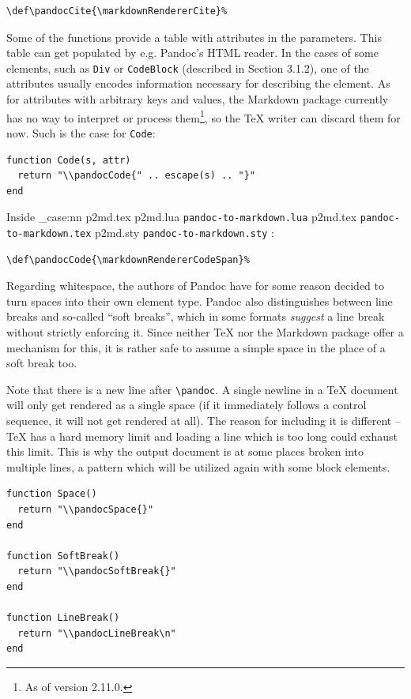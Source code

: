 \documentclass[
  digital,     %
  oneside,     %
  nosansbold,  %
  nocolorbold, %
  lof,         %
  nolot,       %
]{fithesis4}
\newcommand\macro[1]{\texttt{\textbackslash{}{#1}}}
\newcommand\pandoc[1]{\macro{pandoc\-{#1}}}
\newcommand\file[1]
  {
    \str_case:nn
      { #1 }
      {
        { p2md.lua } { \texttt{pandoc\hyp{}to\hyp{}markdown.lua} }
        { p2md.tex } { \texttt{pandoc\hyp{}to\hyp{}markdown.tex} }
        { p2md.sty } { \texttt{pandoc\hyp{}to\hyp{}markdown.sty} }
      }
  }
\begin{document}
\noindent
\lstset{language=[plain]TeX}
\begin{lstlisting}
\def\pandocCite{\markdownRendererCite}%
\end{lstlisting}

\noindent
Some of the functions provide a table with attributes in the parameters. This table can get populated by e.g. Pandoc's HTML reader. In the cases of some elements, such as \texttt{Div} or \texttt{CodeBlock} (described in Section 3.1.2), one of the attributes usually encodes information necessary for describing the element. As for attributes with arbitrary keys and values, the Markdown package currently has no way to interpret or process them\footnote{As of version 2.11.0.}, so the \TeX{} writer can discard them for now. Such is the case for \texttt{Code}:

\noindent
\lstset{language=[5.3]Lua}
\begin{lstlisting}
function Code(s, attr)
  return "\\pandocCode{" .. escape(s) .. "}"
end
\end{lstlisting}

\noindent
Inside \file{p2md.tex}:

\noindent
\lstset{language=[plain]TeX}
\begin{lstlisting}
\def\pandocCode{\markdownRendererCodeSpan}%
\end{lstlisting}

\noindent
Regarding whitespace, the authors of Pandoc have for some reason decided to turn spaces into their own element type. Pandoc also distinguishes between line breaks and so-called ``soft breaks'', which in some formats \textit{suggest} a line break without strictly enforcing it. Since neither \TeX{} nor the Markdown package offer a mechanism for this, it is rather safe to assume a simple space in the place of a soft break too.

Note that there is a new line after \pandoc{LineBreak}. A single newline in a \TeX{} document will only get rendered as a single space (if it immediately follows a control sequence, it will not get rendered at all). The reason for including it is different -- \TeX{} has a hard memory limit and loading a line which is too long could exhaust this limit. This is why the output document is at some places broken into multiple lines, a pattern which will be utilized again with some block elements.

\noindent
\lstset{language=[5.3]Lua}
\begin{lstlisting}
function Space()
  return "\\pandocSpace{}"
end

function SoftBreak()
  return "\\pandocSoftBreak{}"
end

function LineBreak()
  return "\\pandocLineBreak\n"
end
\end{lstlisting}
\end{document}
